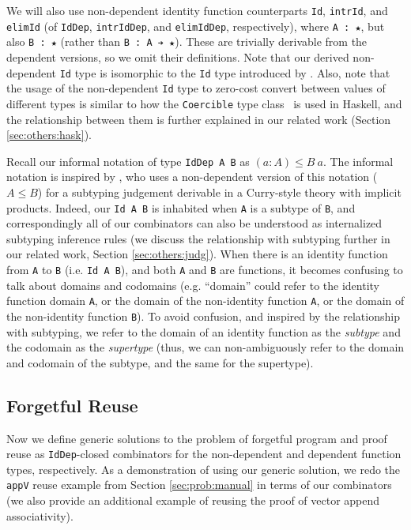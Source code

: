\documentclass[acmsmall]{acmart}\settopmatter{}
\newcommand{\refsec}[1]{Section \ref{sec:#1}}
\newcommand{\labsec}[1]{\label{sec:#1}}
\begin{document}
We will also use non-dependent identity function counterparts
\verb;Id;, \verb;intrId;, and \verb;elimId;
(of \verb;IdDep;, \verb;intrIdDep;, and \verb;elimIdDep;, respectively),
where \verb;A : ★;, but also \verb;B : ★; (rather than \verb;B : A ➔ ★;).
These are trivially derivable from the dependent versions, so we
omit their definitions. Note that our derived non-dependent \verb;Id;
type is isomorphic to the \verb;Id; type introduced by
\citet{firsov18b}. Also, note that the usage of the non-dependent
\verb;Id; type to zero-cost convert between values of different types
is similar to how the \verb;Coercible; type class~\cite{breitner+16}
is used in Haskell, and the relationship between them is further
explained in our related work (\refsec{others:hask}).

Recall our informal notation of type
\verb;IdDep A B; as $(a : A) \leq B~a$.
The informal notation is
inspired by \citet{miquel01}, who uses a non-dependent version
of this notation ($A \leq B$) for a
subtyping judgement derivable in a Curry-style theory with implicit
products. Indeed, our \verb;Id A B; is inhabited when
\verb;A; is a subtype of \verb;B;, and correspondingly all of
our combinators can also be understood as internalized subtyping
inference rules (we discuss the relationship with subtyping further in
our related work, \refsec{others:judg}).
When there is an identity function
from \verb;A; to \verb;B; (i.e. \verb;Id A B;), and both
\verb;A; and \verb;B; are functions, it becomes confusing to talk
about domains and codomains (e.g. ``domain'' could refer to the
identity function domain \verb;A;, or the
domain of the non-identity function \verb;A;,
or the domain of the non-identity function \verb;B;). To avoid confusion,
and inspired by the relationship with subtyping, we refer to the
domain of an identity function as the \textit{subtype} and the
codomain as the \textit{supertype} (thus, we can non-ambiguously refer
to the domain and codomain of the subtype, and the same for the supertype).

\subsection{Forgetful Reuse}
\labsec{prog:fog}

Now we define generic solutions to the problem of
forgetful program and proof reuse as \verb;IdDep;-closed
combinators for the non-dependent and dependent function types,
respectively. As a demonstration of using our generic solution,
we redo the \verb;appV; reuse example from \refsec{prob:manual} in
terms of our combinators (we also provide an additional example of
reusing the proof of vector append associativity).
\end{document}
